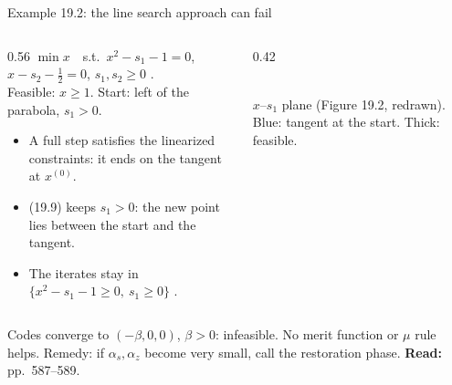 \documentclass[aspectratio=169,12pt]{beamer}
\newcommand{\eqn}[1]{\text{\small(#1)}}
\newcommand{\readbook}[1]{{\color{red}\textbf{Read:} #1}}
\begin{document}
\begin{frame}{Example 19.2: the line search approach can fail}
  \begin{columns}[T,totalwidth=\textwidth]
    \begin{column}{0.56\textwidth}
      $\min x$\ \ s.t.\ $x^{2}-s_{1}-1=0$, $x-s_{2}-\tfrac12=0$, $s_{1},s_{2}\ge 0$ \eqn{19.53}.\\[0.2em]
      Feasible: $x\ge 1$. Start: left of the parabola, $s_{1}>0$.
      \begin{itemize}\setlength\itemsep{0.2em}
        \item A full step satisfies the linearized constraints: it ends on the tangent at $x^{(0)}$.
        \item (19.9) keeps $s_{1}>0$: the new point lies between the start and the tangent.
        \item The iterates stay in $\{x^{2}-s_{1}-1\ge 0,\ s_{1}\ge 0\}$ \eqn{19.54}.
      \end{itemize}
    \end{column}
    \begin{column}{0.42\textwidth}
      \centering
      \\
      {\small $x$--$s_{1}$ plane (Figure 19.2, redrawn). Blue: tangent at the start. Thick: feasible.}
    \end{column}
  \end{columns}
  \vspace{0.2em}
  Codes converge to $(-\beta,0,0)$, $\beta>0$: infeasible. No merit function or $\mu$ rule helps.
  Remedy: if $\alpha_{s},\alpha_{z}$ become very small, call the restoration phase. \readbook{pp.~587--589.}
\end{frame}
\end{document}
